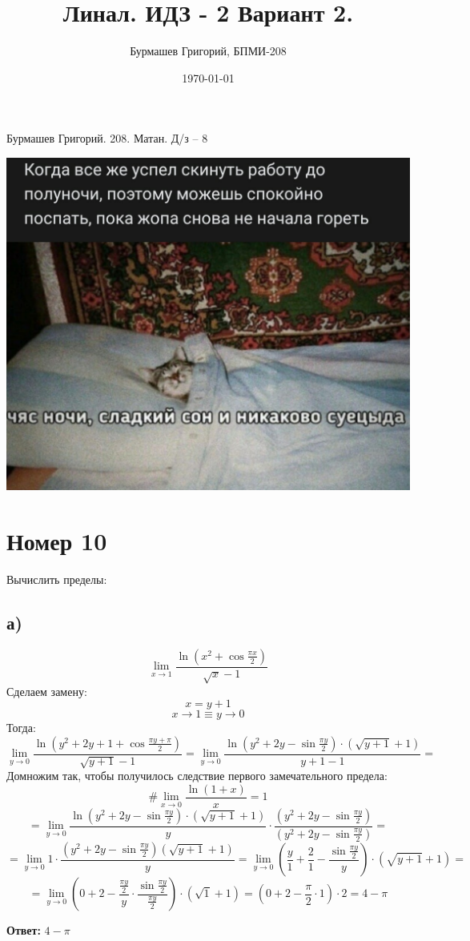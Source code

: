 \documentclass[a4paper,12pt]{article}
\author{Бурмашев Григорий, БПМИ-208}
\title{Линал. ИДЗ - 2 Вариант 2.}
\date{\today}
\begin{document}
\begin{center}
Бурмашев Григорий.  208. Матан. Д/з -- 8
\end{center}
\begin{center}
\includegraphics[scale=0.3]{lc4hntpQu94.jpg}
\end{center}
\newpage
\section*{Номер 10 }
\begin{center}
Вычислить пределы:
\end{center}
\subsection*{а)} 
\[
\lim_{x \rightarrow 1} \frac{\ln (x^2 + \cos \frac{\pi x}{2})}{\sqrt{x} - 1}
\]
Сделаем замену:
\[
x = y  + 1
\]
\[
x \rightarrow 1 \equiv y \rightarrow 0
\]
Тогда:
\[
\lim_{y \rightarrow 0} \frac{\ln (y^2 + 2y + 1 + \cos \frac{\pi y + \pi}{2})}{\sqrt{y + 1} - 1} = \lim_{y \rightarrow 0} \frac{\ln (y^2 + 2y -  \sin \frac{\pi y}{2}) \cdot (\sqrt{y + 1} + 1)}{y + 1 - 1}  = 
\]
Домножим так, чтобы получилось следствие первого замечательного предела:
\[
\text{\#   } \lim_{x \rightarrow 0} \frac{\ln (1 + x)}{x} = 1
\]
\[
= \lim_{y \rightarrow 0} \frac{\ln (y^2 + 2y -  \sin \frac{\pi y}{2}) \cdot (\sqrt{y + 1} + 1)}{y} \cdot \frac{(y^2 + 2y - \sin \frac{\pi y}{2})}{(y^2 + 2y - \sin \frac{\pi y}{2})} =
\]
\[
= \lim_{y \rightarrow 0} 1 \cdot \frac{(y^2 + 2y - \sin \frac{\pi y}{2})(\sqrt{y+1} + 1)}{y} = \lim_{y \rightarrow 0} (\frac{y}{1} + \frac{2}{1} - \frac{\sin \frac{\pi y}{2}}{y})  \cdot (\sqrt{y  +1 } + 1) = 
\]
\[
= \lim_{y \rightarrow 0}(0 + 2 - \frac{\frac{\pi y}{2}}{y} \cdot \frac{\sin \frac{\pi y}{2}}{\frac{\pi y}{2}}) \cdot (\sqrt{1} + 1) = (0 + 2 - \frac{\pi}{2} \cdot 1) \cdot 2 = 4 - \pi
\]
\begin{center}
\textbf{Ответ:} $4 - \pi$
\end{center}
\end{document}
